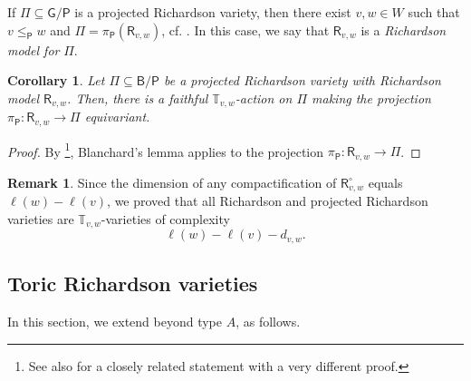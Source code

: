 \documentclass[a4paper, 11pt]{amsart}
\newcommand{\parabolic}{\mathsf{P}}
\newcommand{\borel}{\mathsf{B}}
\newcommand{\orich}[1]{\mathsf{R}^{\circ}_{#1}}
\newcommand{\rich}[1]{\mathsf{R}_{#1}}
\newcommand{\group}{\mathsf{G}}
\newcommand{\dil}[1]{\mathbb{T}_{#1}}
\newtheorem{corollary}[theorem]{Corollary}%
\theoremstyle{definition}
\newtheorem{remark}[theorem]{Remark}
\begin{document}
If $\Pi \subseteq \group/\parabolic$ is a projected Richardson variety, then there exist $v, w \in W$ such that $v \leq_{\parabolic} w$ and $\Pi = \pi_{\parabolic}(\rich{v,w})$, cf. \cite[Section 3]{KLS_projections}. In this case, we say that $\rich{v,w}$ is a \emph{Richardson model for} $\Pi$.

\begin{corollary}
    Let $\Pi \subseteq \borel/\parabolic$ be a projected Richardson variety with Richardson model $\rich{v,w}$. Then, there is a faithful $\dil{v, w}$-action on $\Pi$ making the projection $\pi_{\parabolic}: \rich{v,w} \to \Pi$ equivariant. 
\end{corollary}
\begin{proof}
    By \cite[Theorem 4.5]{KLS_projections}\footnote{See also \cite[Theorem 1.1]{BilleyCoskun} for a closely related statement with a very different proof.}, Blanchard's lemma \cite[Theorem 7.2.1]{Brion_structure} applies to the projection $\pi_{\parabolic}: \rich{v,w} \to \Pi$.
\end{proof}

\begin{remark}
Since the dimension of any compactification of $\orich{v,w}$ equals  $\ell(w) - \ell(v)$, we proved that all Richardson and projected Richardson varieties are $\dil{v, w}$-varieties of complexity
\[
\ell(w) - \ell(v) - d_{v,w}.
\]
\end{remark}

\subsection{Toric Richardson varieties} In this section, we extend \cite[Theorem 1.2]{GKSB} beyond type $A$, as follows.
\end{document}
